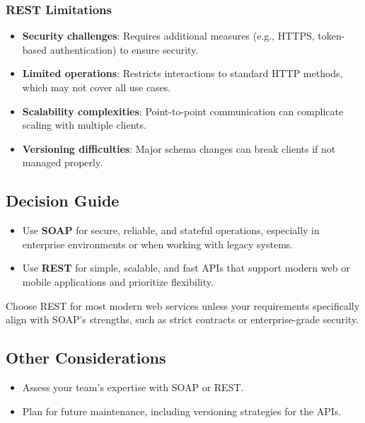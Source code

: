 \documentclass[12pt]{article}
\begin{document}
\subsubsection*{REST Limitations}

\begin{itemize}[leftmargin=1.5em]
    \item \textbf{Security challenges}: Requires additional measures (e.g., HTTPS, token-based authentication) to ensure security.
    \item \textbf{Limited operations}: Restricts interactions to standard HTTP methods, which may not cover all use cases.
    \item \textbf{Scalability complexities}: Point-to-point communication can complicate scaling with multiple clients.
    \item \textbf{Versioning difficulties}: Major schema changes can break clients if not managed properly.
\end{itemize}

\subsection{Decision Guide}

\begin{itemize}[leftmargin=1.5em]
    \item Use \textbf{SOAP} for secure, reliable, and stateful operations, especially in enterprise environments or when working with legacy systems.
    \item Use \textbf{REST} for simple, scalable, and fast APIs that support modern web or mobile applications and prioritize flexibility.
\end{itemize}

\begin{tcolorbox}[colback=green!5!white,colframe=green!40!black,title=Tip]
Choose REST for most modern web services unless your requirements specifically align with SOAP’s strengths, such as strict contracts or enterprise-grade security.
\end{tcolorbox}

\subsection{Other Considerations}

\begin{itemize}[leftmargin=1.5em]
    \item Assess your team's expertise with SOAP or REST.
    \item Plan for future maintenance, including versioning strategies for the APIs.
\end{itemize}
\end{document}
